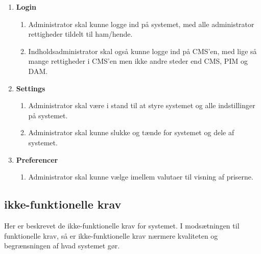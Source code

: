 \begin{enumerate}
\item \textbf{Login}
	\begin{enumerate}
	\item Administrator skal kunne logge ind på systemet, med alle administrator rettigheder tildelt til ham/hende.
	\item Indholdsadministrator skal også kunne logge ind på CMS'en, med lige så mange rettigheder i CMS'en men ikke andre steder end CMS, PIM og DAM. 
	\end{enumerate}

\item\textbf{Settings}
	\begin{enumerate}
	\item Administrator skal være i stand til at styre systemet og alle indstillinger på systemet.
	\item Administrator skal kunne slukke og tænde for systemet og dele af systemet.
	\end{enumerate}
    
\item\textbf{Preferencer}
	\begin{enumerate}
	\item Administrator skal kunne vælge imellem valutaer til visning af priserne.
	\end{enumerate}
\end{enumerate}


\subsection{ikke-funktionelle krav}
	Her er beskrevet de ikke-funktionelle krav for systemet. I modsætningen til funktionelle krav, så er ikke-funktionelle krav nærmere kvaliteten og begrænsningen af hvad systemet gør. 

